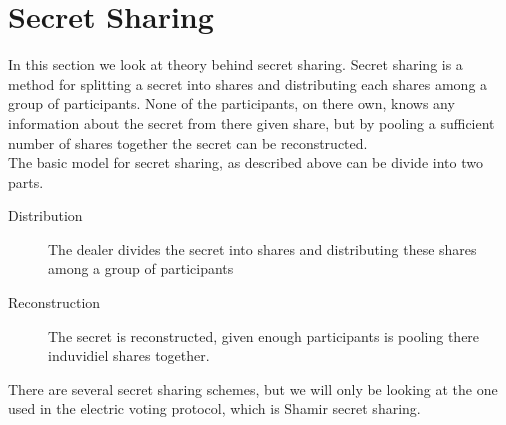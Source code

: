 \section{Secret Sharing}
In this section we look at theory behind secret sharing. Secret sharing is a method for splitting a secret into shares and distributing each shares among a group of participants. None of the participants, on there own, knows any information about the secret from there given share, but by pooling a sufficient number of shares together the secret can be reconstructed. \\

\noindent
The basic model for secret sharing, as described above can be divide into two parts. 

\begin{description}
    \item[Distribution] The dealer divides the secret into shares and distributing these shares among a group of participants 
    \item[Reconstruction] The secret is reconstructed, given enough participants is pooling there induvidiel shares together. 
\end{description}

\noindent
There are several secret sharing schemes, but we will only be looking at the one used in the electric voting protocol, which is Shamir secret sharing.

